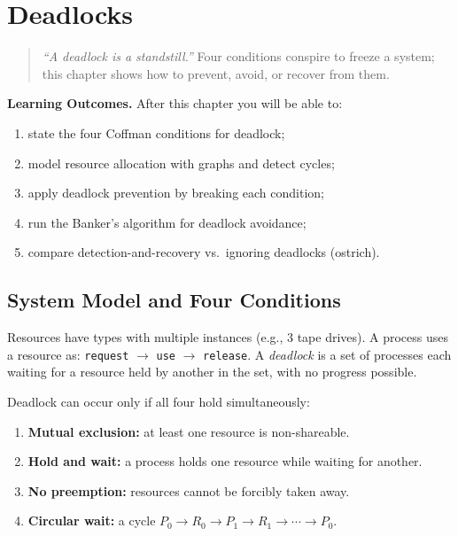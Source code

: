 \chapter{Deadlocks}
\label{ch:deadlocks}

\begin{quote}
\emph{``A deadlock is a standstill.''} Four conditions conspire to freeze a
system; this chapter shows how to prevent, avoid, or recover from them.
\end{quote}

\noindent\textbf{Learning Outcomes.} After this chapter you will be able to:
\begin{enumerate}[label=(L\arabic*)]
  \item state the four Coffman conditions for deadlock;
  \item model resource allocation with graphs and detect cycles;
  \item apply deadlock prevention by breaking each condition;
  \item run the Banker's algorithm for deadlock avoidance;
  \item compare detection-and-recovery vs.\ ignoring deadlocks (ostrich).
\end{enumerate}

\section{System Model and Four Conditions}
\label{sec:deadlock-conditions}

Resources have types with multiple instances (e.g., 3 tape drives). A process
uses a resource as: \texttt{request} $\to$ \texttt{use} $\to$ \texttt{release}.
A \emph{deadlock} is a set of processes each waiting for a resource held by
another in the set, with no progress possible.

\begin{theorem}
Deadlock can occur only if all four hold simultaneously:
\begin{enumerate}[label=(\arabic*)]
  \item \textbf{Mutual exclusion:} at least one resource is non-shareable.
  \item \textbf{Hold and wait:} a process holds one resource while waiting for another.
  \item \textbf{No preemption:} resources cannot be forcibly taken away.
  \item \textbf{Circular wait:} a cycle $P_0\to R_0\to P_1\to R_1\to\cdots\to P_0$.
\end{enumerate}
\end{theorem}

